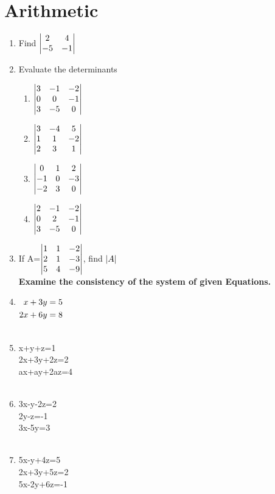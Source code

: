 \documentclass[journal,12pt,twocolumn]{IEEEtran}
\renewcommand\thesection{\arabic{section}}
\begin{document}
\section{Arithmetic}
\renewcommand{\theequation}{\theenumi}
\begin{enumerate}[label=\thesection.\arabic*.,ref=\thesection.\theenumi]

\item Find 
$\begin{vmatrix}
2&4\\-5&-1
\end{vmatrix}$
\\
\solution 
%
\item Evaluate the determinants
\begin{enumerate}
\item $\begin{vmatrix}
3&-1&-2\\0&0&-1\\3&-5&0
\end{vmatrix}$
\item $\begin{vmatrix}
3&-4&5\\1&1&-2\\2&3&1
\end{vmatrix}$
\\
\solution 
%
\item $\begin{vmatrix}
0&1&2 \\ -1&0&-3\\-2&3&0
\end{vmatrix}$
\item $\begin{vmatrix}
2&-1&-2\\0&2&-1\\3&-5&0
\end{vmatrix}$
\end{enumerate}  
\item If A=$\begin{vmatrix}1&1&-2\\2&1&-3\\5&4&-9\end{vmatrix}$, 
find $\left\vert A\right\vert$
\\
\solution 
%
\textbf{Examine the consistency of the system of given Equations.}
\item $\begin{alignedat}[t]{2}
x+3y&=5 
\\
2x+6y&=8 
\end{alignedat}$\\
\\
\solution 
%
\item x+y+z=1\\ 2x+3y+2z=2\\ax+ay+2az=4\\
\\
\solution 
%
\item 3x-y-2z=2 \\ 2y-z=-1 \\ 3x-5y=3\\
\\
\solution 
%
\item 5x-y+4z=5 \\ 2x+3y+5z=2 \\ 5x-2y+6z=-1\\
\\
\solution
%

\end{enumerate}
 
\end{document}
